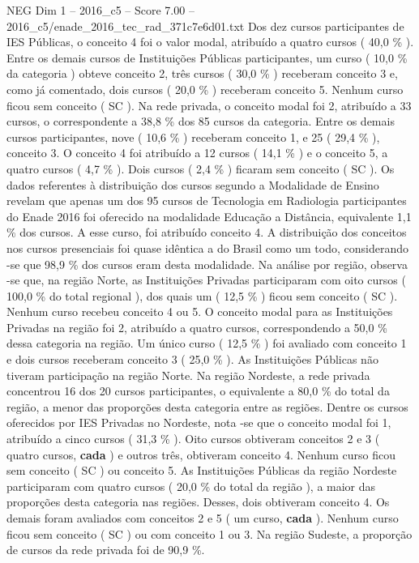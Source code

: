 \begin{textsample}{NEG Dim 1 – 2016\_c5 – Score 7.00 – 2016\_c5/enade\_2016\_tec\_rad\_371c7e6d01.txt}
Dos dez cursos participantes de IES Públicas, o conceito 4 foi o valor modal, atribuído a quatro cursos ( 40,0 \% ).
Entre os demais cursos de Instituições Públicas participantes, um curso ( 10,0 \% da categoria ) obteve conceito 2, três cursos ( 30,0 \% ) receberam conceito 3 e, como já comentado, dois cursos ( 20,0 \% ) receberam conceito 5.
Nenhum curso ficou sem conceito ( SC ).
Na rede privada, o conceito modal foi 2, atribuído a 33 cursos, o correspondente a 38,8 \% dos 85 cursos da categoria.
Entre os demais cursos participantes, nove ( 10,6 \% ) receberam conceito 1, e 25 ( 29,4 \% ), conceito 3.
O conceito 4 foi atribuído a 12 cursos ( 14,1 \% ) e o conceito 5, a quatro cursos ( 4,7 \% ).
Dois cursos ( 2,4 \% ) ficaram sem conceito ( SC ).
Os dados referentes à distribuição dos cursos segundo a Modalidade de Ensino revelam que apenas um dos 95 cursos de Tecnologia em Radiologia participantes do Enade 2016 foi oferecido na modalidade Educação a Distância, equivalente 1,1 \% dos cursos.
A esse curso, foi atribuído conceito 4.
A distribuição dos conceitos nos cursos presenciais foi quase idêntica a do Brasil como um todo, considerando -se que 98,9 \% dos cursos eram desta modalidade.
Na análise por região, observa -se que, na região Norte, as Instituições Privadas participaram com oito cursos ( 100,0 \% do total regional ), dos quais um ( 12,5 \% ) ficou sem conceito ( SC ).
Nenhum curso recebeu conceito 4 ou 5.
O conceito modal para as Instituições Privadas na região foi 2, atribuído a quatro cursos, correspondendo a 50,0 \% dessa categoria na região.
Um único curso ( 12,5 \% ) foi avaliado com conceito 1 e dois cursos receberam conceito 3 ( 25,0 \% ).
As Instituições Públicas não tiveram participação na região Norte.
Na região Nordeste, a rede privada concentrou 16 dos 20 cursos participantes, o equivalente a 80,0 \% do total da região, a menor das proporções desta categoria entre as regiões.
Dentre os cursos oferecidos por IES Privadas no Nordeste, nota -se que o conceito modal foi 1, atribuído a cinco cursos ( 31,3 \% ).
Oito cursos obtiveram conceitos 2 e 3 ( quatro cursos, \textbf{cada} ) e outros três, obtiveram conceito 4.
Nenhum curso ficou sem conceito ( SC ) ou conceito 5.
As Instituições Públicas da região Nordeste participaram com quatro cursos ( 20,0 \% do total da região ), a maior das proporções desta categoria nas regiões.
Desses, dois obtiveram conceito 4.
Os demais foram avaliados com conceitos 2 e 5 ( um curso, \textbf{cada} ).
Nenhum curso ficou sem conceito ( SC ) ou com conceito 1 ou 3.
Na região Sudeste, a proporção de cursos da rede privada foi de 90,9 \%.

\end{textsample}
